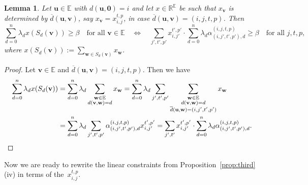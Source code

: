 \documentclass[10pt,a4paper]{article}
\newcommand{\E}{\mathbb{E}}
\newtheorem{lemma}[theorem]{Lemma}
\theoremstyle{definition}
\newcommand{\uu}{\mathbf{u}}
\newcommand{\vv}{\mathbf{v}}
\newcommand{\ww}{\mathbf{w}}
\newcommand{\zero}{\mathbf{0}}
\begin{document}
\begin{lemma}\label{lem:lambdasqary}
Let $\uu \in \E$ with $d(\uu,\zero)=i$ and let $x \in \mathbb{R}^{\E}$ be such that $x_{\vv}$ is determined by $\overline{d}(\uu ,\vv)$, say $x_{\vv}=x_{i,j}^{t,p}$, in case $\overline{d}(\uu ,\vv)=(i,j,t,p)$. Then 
\[
\sum_{d=0}^n \lambda_d x(S_d( \vv ))\geq \beta \quad \text{for all $\vv \in\E$} \quad \Longleftrightarrow \quad
\sum_{j',t',p'} x_{i,j'}^{t',p'}\cdot \sum_{d=0}^n \lambda_d \alpha_{(i,j',t',p'),d}^{(i,j,t,p)} \geq \beta \quad \text{for all $j,t,p$},
\]
where $x(S_d( \vv )) := \sum_{\ww \in S_d(\vv)} x_{\ww}$.
\end{lemma}
\begin{proof}
Let $\vv \in \E$ and $\overline{d}(\uu,\vv) = (i,j,t,p)$. Then we have 
\begin{align*}
\sum_{d=0}^n \lambda_d x(S_d(\vv)) & = \sum_{d=0}^n \lambda_d \sum_{\substack{\ww \in\E \\ d(\vv,\ww) = d}} x_{\ww} = \sum_{d=0}^n \lambda_d \sum_{j',t',p'} \sum_{\substack{\ww \in \E\\d(\vv, \ww)=d \\ \overline{d}(\uu, \ww)=(i,j',t',p')}}x_{\ww} \\
&= \sum_{d=0}^n \lambda_d\sum_{j',t',p'} \alpha_{(i,j',t',p'),d}^{(i,j,t,p)} x_{i,j'}^{t',p'}= \sum_{j',t'} x_{i,j'}^{t',p'} \cdot \sum_{d=0}^n \lambda_d \alpha_{(i,j',t',p'),d}^{(i,j,t,p)}. \qedhere
\end{align*}
\end{proof}

Now we are ready to rewrite the linear constraints from Proposition~\ref{prop:third} (iv) in terms of the~$x_{i,j}^{t,p}$. 
\end{document}
